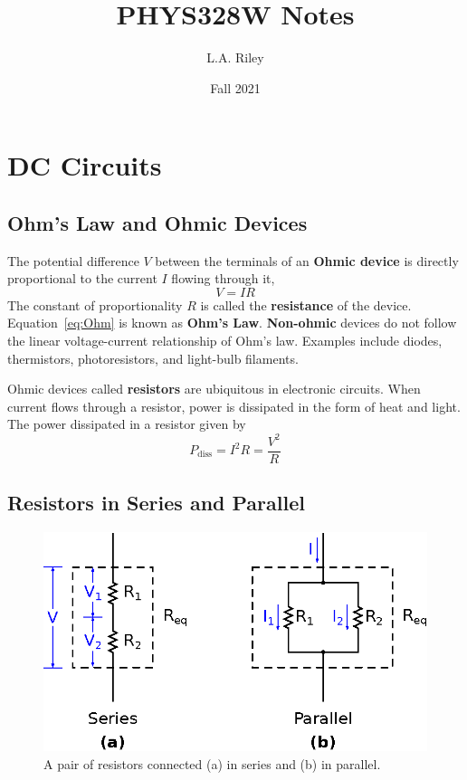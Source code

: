 \documentclass[11pt]{article}
\title{PHYS328W Notes} \author{L.A. Riley} \date{Fall 2021}
\begin{document}
\thispagestyle{empty}

\maketitle

\section{DC Circuits}

\subsection{Ohm's Law and Ohmic Devices}
\label{sec:ohm}

The potential difference $V$ between the terminals of an \textbf{Ohmic
device} is directly proportional to the current $I$ flowing through it,
\begin{equation}
  V=IR
\label{eq:Ohm}
\end{equation}
The constant of proportionality $R$ is called the \textbf{resistance}
of the device. Equation~\ref{eq:Ohm} is known as \textbf{Ohm's
  Law}.
\textbf{Non-ohmic} devices do not follow the linear voltage-current
relationship of Ohm's law. Examples include diodes, thermistors,
photoresistors, and light-bulb filaments.

Ohmic devices called \textbf{resistors} are ubiquitous in
electronic circuits. When current flows through a resistor, power is
dissipated in the form of heat and light. The power dissipated in a
resistor given by
\begin{equation}
  P_\mathrm{diss} = I^2 R = \frac{V^2}{R}
\end{equation}

\subsection{Resistors in Series and Parallel}
\label{sec:serpar}

\begin{figure}[ht]
  \begin{center}
    \includegraphics{seriesparallel.eps}
    \caption{A pair of resistors connected (a) in series and (b) in
      parallel.}
    \label{fig:seriesparallel}
  \end{center}
\end{figure}
\end{document}
